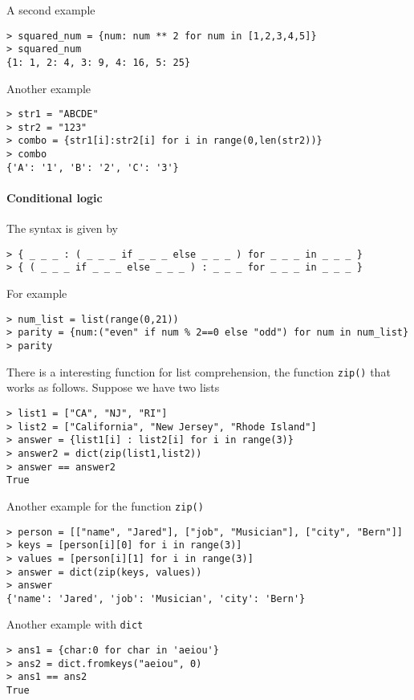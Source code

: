A second example
\begin{verbatim}
> squared_num = {num: num ** 2 for num in [1,2,3,4,5]}
> squared_num
{1: 1, 2: 4, 3: 9, 4: 16, 5: 25}
\end{verbatim}

Another example
\begin{verbatim}
> str1 = "ABCDE"
> str2 = "123"
> combo = {str1[i]:str2[i] for i in range(0,len(str2))}
> combo
{'A': '1', 'B': '2', 'C': '3'}
\end{verbatim}

\paragraph{Conditional logic} The syntax is given by
\begin{verbatim}
> { _ _ _ : ( _ _ _ if _ _ _ else _ _ _ ) for _ _ _ in _ _ _ }
> { ( _ _ _ if _ _ _ else _ _ _ ) : _ _ _ for _ _ _ in _ _ _ }
\end{verbatim}
For example
\begin{verbatim}
> num_list = list(range(0,21))
> parity = {num:("even" if num % 2==0 else "odd") for num in num_list}
> parity 
\end{verbatim}

There is a interesting function for list comprehension, the function \verb|zip()| that works as follows. Suppose we have two lists 
\begin{verbatim}
> list1 = ["CA", "NJ", "RI"]
> list2 = ["California", "New Jersey", "Rhode Island"]
> answer = {list1[i] : list2[i] for i in range(3)}
> answer2 = dict(zip(list1,list2))  
> answer == answer2
True
\end{verbatim}

Another example for the function \verb|zip()|
\begin{verbatim}
> person = [["name", "Jared"], ["job", "Musician"], ["city", "Bern"]]
> keys = [person[i][0] for i in range(3)]
> values = [person[i][1] for i in range(3)]
> answer = dict(zip(keys, values))
> answer
{'name': 'Jared', 'job': 'Musician', 'city': 'Bern'}
\end{verbatim}

Another example with \verb|dict|
\begin{verbatim}
> ans1 = {char:0 for char in 'aeiou'}	
> ans2 = dict.fromkeys("aeiou", 0)
> ans1 == ans2
True
\end{verbatim}



